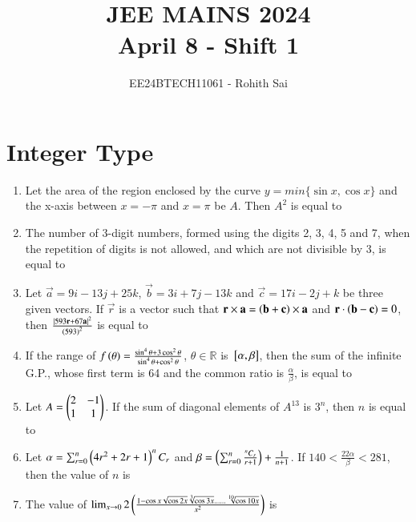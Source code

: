 \documentclass[journal]{IEEEtran}
\begin{document}

\vspace{3cm}

\title{JEE MAINS 2024\\April 8 - Shift 1}
\author{EE24BTECH11061 - Rohith Sai}
\maketitle

\renewcommand{\thefigure}{\theenumi}
\renewcommand{\thetable}{\theenumi}

\section*{Integer Type}
\begin{enumerate}
\item Let the area of the region enclosed by the curve $y=min\{\sin{x}, \cos{x}\}$ and the x-axis between $x=-\pi$ and $x=\pi$ be $A$. Then $A^2$ is equal to

\item The number of 3-digit numbers, formed using the digits 2, 3, 4, 5 and 7, when the repetition of digits is not allowed, and which are not divisible by 3, is equal to

\item Let $\vec{a} = 9i-13j+25k$, $\vec{b} = 3i+7j-13k$ and $\vec{c} = 17i-2j+k$ be three given vectors. If $\vec{r}$ is a vector such that $\mathbf{r}\times\mathbf{a} = \left(\mathbf{b} + \mathbf{c}\right)\times\mathbf{a}$ and $\mathbf{r}\cdot\left(\mathbf{b} - \mathbf{c}\right) = 0$, then $\frac{\left\vert593\mathbf{r}+67\mathbf{a}\right\vert^2}{\left(593\right)^2}$ is equal to

\item If the range of $f\left(\theta\right) = \frac{\sin^4{\theta}+3\cos^2{\theta}}{\sin^4{\theta}+\cos^2{\theta}}$, $\theta \in \mathbb{R}$ is ${}\left[\alpha,\beta\right]$, then the sum of the infinite G.P., whose first term is 64 and the common ratio is $\frac{\alpha}{\beta}$, is equal to

\item Let $A = \begin{pmatrix}2 & -1\\1 & 1\end{pmatrix}$. If the sum of diagonal elements of $A^{13}$ is $3^n$, then $n$ is equal to

\item Let $\alpha = \sum^n_{r=0} \left(4r^2+2r+1\right) ^nC_r$ and $\beta = \left(\sum^n_{r=0} \frac{^nC_r}{r+1}\right) + \frac{1}{n+1}$. If $140 < \frac{22\alpha}{\beta}<281$, then the value of $n$ is

\item The value of $\lim_{x \to 0} 2\left(\frac{1-\cos{x}\sqrt{\cos{2x}}\sqrt[3]{\cos{3x}}\dots\dots\sqrt[10]{\cos{10x}}}{x^2}\right)$ is


\end{enumerate}
\end{document}
